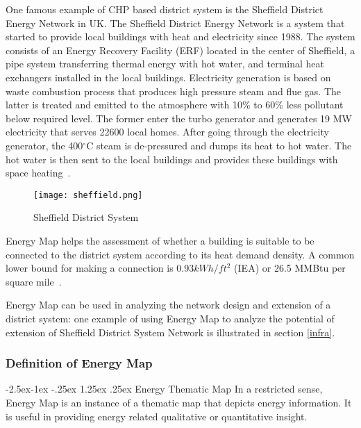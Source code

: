 \documentclass[hidelinks,12pt]{article}
\makeatletter
\renewcommand\paragraph{\@startsection{paragraph}{4}{\z@}%
            {-2.5ex\@plus -1ex \@minus -.25ex}%
            {1.25ex \@plus .25ex}%
            {\normalfont\normalsize\bfseries}}
\makeatother
\begin{document}
One famous example of CHP based district system is the Sheffield
District Energy Network in UK. The Sheffield District Energy Network
is a system that started to provide local buildings with heat and
electricity since 1988. The system consists of an Energy Recovery
Facility (ERF) located in the center of Sheffield, a pipe system
transferring thermal energy with hot water, and terminal heat
exchangers installed in the local buildings. Electricity generation is
based on waste combustion process that produces high pressure steam
and flue gas. The latter is treated and emitted to the atmosphere with
10\% to 60\% less pollutant below required level. The former enter the
turbo generator and generates 19 MW electricity that serves 22600
local homes. After going through the electricity generator, the
400$^\circ$C steam is de-pressured and dumps its heat to hot
water. The hot water is then sent to the local buildings and provides
these buildings with space heating~\cite{veolia2014}.
\begin{figure}[htbp]
  \centering
  \texttt{[image: sheffield.png]}
  \caption{Sheffield District System}
  \label{fig:sheffield}
\end{figure}

Energy Map helps the assessment of whether a building is suitable to
be connected to the district system according to its heat demand
density. A common lower bound for making a connection is
0.93$kWh/ft^2$ (IEA) or 26.5 MMBtu per square mile~\cite{IDEA2012}.

Energy Map can be used in analyzing the network design and extension
of a district system: one example of using Energy
Map to analyze the potential of extension of Sheffield District System
Network is illustrated in section \ref{infra}.

\subsubsection{Definition of Energy Map}
\paragraph{Energy Thematic Map}\label{energyThematicMap}
In a restricted sense, Energy Map is an instance of a thematic map
that depicts energy information. It is useful in providing
energy related qualitative or quantitative insight. 
\end{document}
